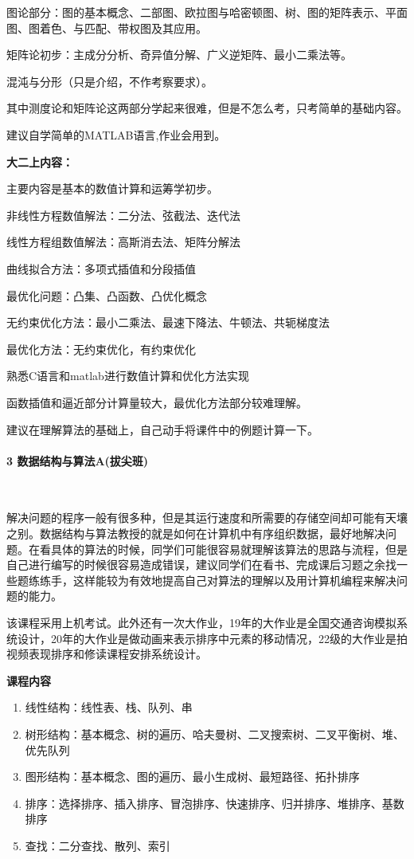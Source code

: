 \documentclass[
decoration,  %
]{qyxf-book}
\begin{document}
图论部分：图的基本概念、二部图、欧拉图与哈密顿图、树、图的矩阵表示、平面图、图着色、与匹配、带权图及其应用。

矩阵论初步：主成分分析、奇异值分解、广义逆矩阵、最小二乘法等。

混沌与分形（只是介绍，不作考察要求）。

其中测度论和矩阵论这两部分学起来很难，但是不怎么考，只考简单的基础内容。

建议自学简单的MATLAB语言,作业会用到。

\textbf{大二上内容：}

主要内容是基本的数值计算和运筹学初步。

非线性方程数值解法：二分法、弦截法、迭代法

线性方程组数值解法：高斯消去法、矩阵分解法

曲线拟合方法：多项式插值和分段插值

最优化问题：凸集、凸函数、凸优化概念

无约束优化方法：最小二乘法、最速下降法、牛顿法、共轭梯度法

最优化方法：无约束优化，有约束优化

熟悉C语言和matlab进行数值计算和优化方法实现

函数插值和逼近部分计算量较大，最优化方法部分较难理解。

建议在理解算法的基础上，自己动手将课件中的例题计算一下。

\hypertarget{ux6570ux636eux7ed3ux6784ux4e0eux7b97ux6cd5}{%
	\paragraph{3 数据结构与算法A(拔尖班)}~{}\label{ux6570ux636eux7ed3ux6784ux4e0eux7b97ux6cd5}}


解决问题的程序一般有很多种，但是其运行速度和所需要的存储空间却可能有天壤之别。数据结构与算法教授的就是如何在计算机中有序组织数据，最好地解决问题。在看具体的算法的时候，同学们可能很容易就理解该算法的思路与流程，但是自己进行编写的时候很容易造成错误，建议同学们在看书、完成课后习题之余找一些题练练手，这样能较为有效地提高自己对算法的理解以及用计算机编程来解决问题的能力。

该课程采用上机考试。此外还有一次大作业，19年的大作业是全国交通咨询模拟系统设计，20年的大作业是做动画来表示排序中元素的移动情况，22级的大作业是拍视频表现排序和修读课程安排系统设计。


\textbf{课程内容}
\begin{enumerate}
	\def\labelenumi{(\arabic{enumi})}
	\item
	线性结构：线性表、栈、队列、串
	\item
	树形结构：基本概念、树的遍历、哈夫曼树、二叉搜索树、二叉平衡树、堆、优先队列
	\item
	图形结构：基本概念、图的遍历、最小生成树、最短路径、拓扑排序
	\item
	排序：选择排序、插入排序、冒泡排序、快速排序、归并排序、堆排序、基数排序
	\item
	查找：二分查找、散列、索引
\end{enumerate}
\end{document}
